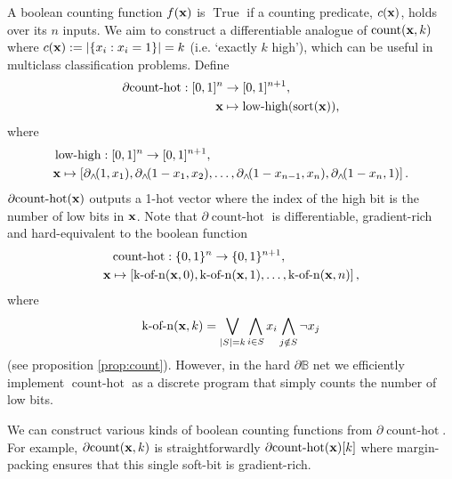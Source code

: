 \documentclass{article}
\theoremstyle{plain}
\theoremstyle{definition}
\theoremstyle{remark}
\begin{document}
A boolean counting function $f({\bf x})$ is $\operatorname{True}$ if a counting predicate, $c({\bf x})$, holds over its $n$ inputs. We aim to construct a differentiable analogue of $\operatorname{count}({\bf x}, k)$ where $c({\bf x}) := |\{x_{i} : x_{i} = 1 \}| = k$ (i.e. `exactly $k$ high'), which can be useful in multiclass classification problems. Define
\begin{equation*}
\begin{aligned}
\partial\!\operatorname{count-hot}: [0,1]^{n} &\to [0,1]^{n+1}, \\
{\bf x} &\mapsto \operatorname{low-high}(\operatorname{sort}({\bf x}))\text{,}
\end{aligned}
\end{equation*}
where 
\begin{equation*}
\begin{aligned}
& \operatorname{low-high}: [0,1]^{n} \to [0,1]^{n+1},\\
& {\bf x} \mapsto \left[ \partial_{\wedge}\!(1, x_{1}), \partial_{\wedge}\!(1 - x_{1}, x_{2}), \dots, 
\partial_{\wedge}\!(1 - x_{n-1}, x_{n}), \partial_{\wedge}\!(1-x_{n}, 1) \right]\text{.}
\end{aligned}
\end{equation*}
$\partial\!\operatorname{count-hot}({\bf x})$ outputs a 1-hot vector where the index of the high bit is the number of low bits in ${\bf x}$. Note that $\partial\!\operatorname{count-hot}$ is differentiable, gradient-rich and hard-equivalent to the boolean function
\begin{equation*}
\begin{aligned}
& \operatorname{count-hot}: \{0,1\}^{n} \to \{0,1\}^{n+1}, \\
{\bf x} &\mapsto \left[\operatorname{k-of-n}({\bf x}, 0), \operatorname{k-of-n}({\bf x}, 1), \dots, \operatorname{k-of-n}({\bf x}, n)\right]\text{,}
\end{aligned}
\end{equation*}
where
\begin{equation*}
\operatorname{k-of-n}({\bf x}, k) = \bigvee_{|S|=k} \bigwedge_{i\in S} x_i \bigwedge_{j\notin S} \neg x_j
\end{equation*}
(see proposition \ref{prop:count}). However, in the hard $\partial\mathbb{B}$ net we efficiently implement $\operatorname{count-hot}$ as a discrete program that simply counts the number of low bits.

We can construct various kinds of boolean counting functions from $\partial\!\operatorname{count-hot}$. For example, $\partial\!\operatorname{count}({\bf x}, k)$ is straightforwardly $\partial\!\operatorname{count-hot}({\bf x})[k]$ where margin-packing ensures that this single soft-bit is gradient-rich.
\end{document}
